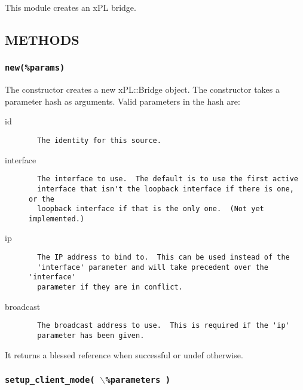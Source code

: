 \documentclass[12pt,a4paper]{article}
\begin{document}
This module creates an xPL bridge.

\subsection*{METHODS\label{xPL::Bridge_METHODS}}
\subsubsection*{\texttt{new(\%params)}\label{xPL::Bridge_new_params_}}


The constructor creates a new xPL::Bridge object.  The constructor
takes a parameter hash as arguments.  Valid parameters in the hash
are:

\begin{description}

\item[{id}] \mbox{}\begin{verbatim}
  The identity for this source.
\end{verbatim}

\item[{interface}] \mbox{}\begin{verbatim}
  The interface to use.  The default is to use the first active
  interface that isn't the loopback interface if there is one, or the
  loopback interface if that is the only one.  (Not yet implemented.)
\end{verbatim}

\item[{ip}] \mbox{}\begin{verbatim}
  The IP address to bind to.  This can be used instead of the
  'interface' parameter and will take precedent over the 'interface'
  parameter if they are in conflict.
\end{verbatim}

\item[{broadcast}] \mbox{}\begin{verbatim}
  The broadcast address to use.  This is required if the 'ip'
  parameter has been given.
\end{verbatim}
\end{description}


It returns a blessed reference when successful or undef otherwise.

\subsubsection*{\texttt{setup\_client\_mode( $\backslash$\%parameters )}\label{xPL::Bridge_setup_client_mode_backslash_parameters_}}
\end{document}
